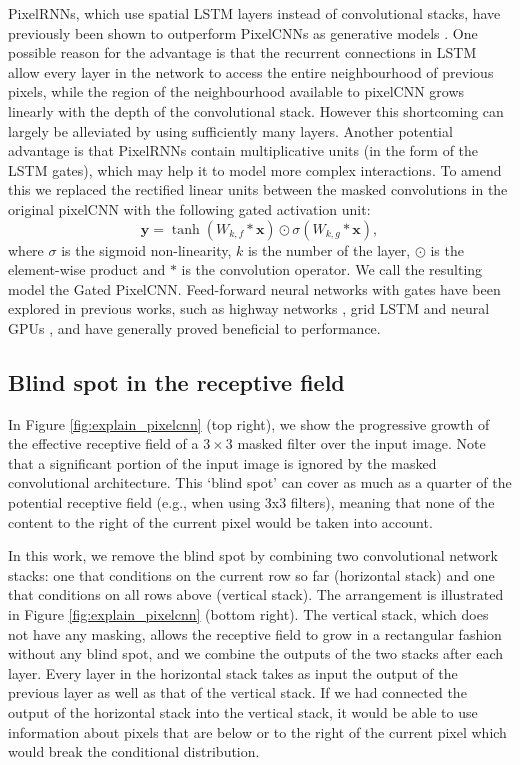 \documentclass{article}
\renewcommand{\vec}{\mathbf}
\begin{document}
PixelRNNs, which use spatial LSTM layers instead of convolutional stacks, have previously been shown to outperform PixelCNNs as generative models \cite{van2016pixel}. One possible reason for the advantage is that the recurrent connections in LSTM allow every layer in the network to access the entire neighbourhood of previous pixels, while the region of the neighbourhood available to pixelCNN grows linearly with the depth of the convolutional stack. However this shortcoming can largely be alleviated by using sufficiently many layers. Another potential advantage is that PixelRNNs contain multiplicative units (in the form of the LSTM gates), which may help it to model more complex interactions. To amend this we replaced the rectified linear units between the masked convolutions in the original pixelCNN with the following gated activation unit:
\begin{equation}
\vec{y} = \tanh (W_{k,f} \ast \vec{x}) \odot \sigma(W_{k,g} \ast \vec{x}), \label{eq:gated_activation}
\end{equation}
where $\sigma$ is the sigmoid non-linearity, $k$ is the number of the layer, $\odot$ is the element-wise product and $\ast$ is the convolution operator. We call the resulting model the Gated PixelCNN.
Feed-forward neural networks with gates have been explored in previous works, such as highway networks \cite{srivastava2015training}, grid LSTM \cite{DBLP:journals/corr/KalchbrennerDG15} and neural GPUs \cite{kaiser2015neural}, and have generally proved beneficial to performance. 

\subsection{Blind spot in the receptive field}

In Figure \ref{fig:explain_pixelcnn} (top right), we show the progressive growth of the effective receptive field of a $3 \times 3$ masked filter over the input image. Note that a significant portion of the input image is ignored by the masked convolutional architecture. This `blind spot' can cover as much as a quarter of the potential receptive field (e.g., when using 3x3 filters), meaning that none of the content to the right of the current pixel would be taken into account. 

In this work, we remove the blind spot by combining two convolutional network stacks: one that conditions on the current row so far (horizontal stack) and one that conditions on all rows above (vertical stack). The arrangement is illustrated in Figure \ref{fig:explain_pixelcnn} (bottom right). The vertical stack, which does not have any masking, allows the receptive field to grow in a rectangular fashion without any blind spot, and we combine the outputs of the two stacks after each layer. Every layer in the horizontal stack takes as input the output of the previous layer as well as that of the vertical stack. If we had connected the output of the horizontal stack into the vertical stack, it would be able to use information about pixels that are below or to the right of the current pixel which would break the conditional distribution.
\end{document}
